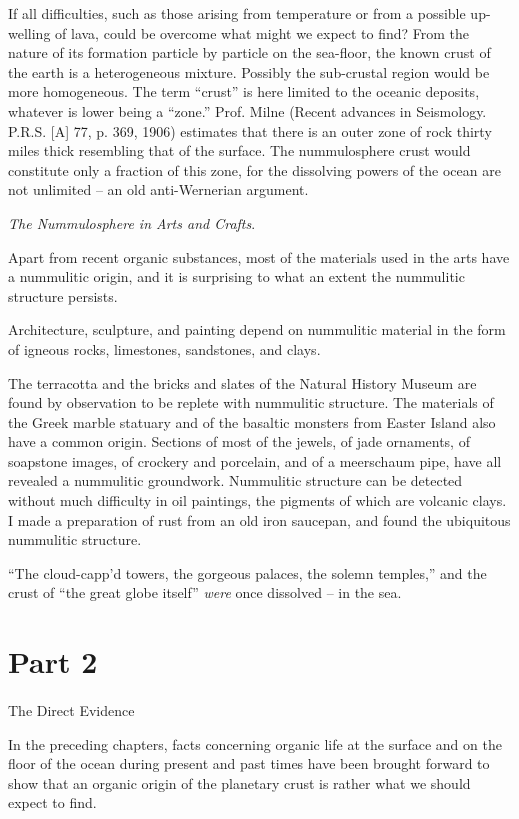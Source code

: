 \documentclass[a4paper, 12pt, oneside]{article}
\begin{document}
If all difficulties, such as those arising from temperature or from a possible up-welling of lava, could be overcome what might we expect to find? From the nature of its formation particle by particle on the sea-floor, the known crust of the earth is a heterogeneous mixture. Possibly the sub-crustal region would be more homogeneous. The term ``crust'' is here limited to the oceanic deposits, whatever is lower being a ``zone.'' Prof. Milne (Recent advances in Seismology. P.R.S. [A] 77, p. 369, 1906) estimates that there is an outer zone of rock thirty miles thick resembling that of the surface. The nummulosphere crust would constitute only a fraction of this zone, for the dissolving powers of the ocean are not unlimited -- an old anti-Wernerian argument.

\emph{The Nummulosphere in Arts and Crafts}.

Apart from recent organic substances, most of the materials used in the arts have a nummulitic origin, and it is surprising to what an extent the nummulitic structure persists.

Architecture, sculpture, and painting depend on nummulitic material in the form of igneous rocks, limestones, sandstones, and clays.

The terracotta and the bricks and slates of the Natural History Museum are found by observation to be replete with nummulitic structure. The materials of the Greek marble statuary and of the basaltic monsters from Easter Island also have a common origin. Sections of most of the jewels, of jade ornaments, of soapstone images, of crockery and porcelain, and of a meerschaum pipe, have all revealed a nummulitic groundwork. Nummulitic structure can be detected without much difficulty in oil paintings, the pigments of which are volcanic clays. I made a preparation of rust from an old iron saucepan, and found the ubiquitous nummulitic structure.

``The cloud-capp'd towers, the gorgeous palaces, the solemn temples,'' and the crust of ``the great globe itself'' \emph{were} once dissolved -- in the sea.
\clearpage
\section{Part 2}
\paragraph{}
The Direct Evidence

In the preceding chapters, facts concerning organic life at the surface and on the floor of the ocean during present and past times have been brought forward to show that an organic origin of the planetary crust is rather what we should expect to find.
\end{document}
